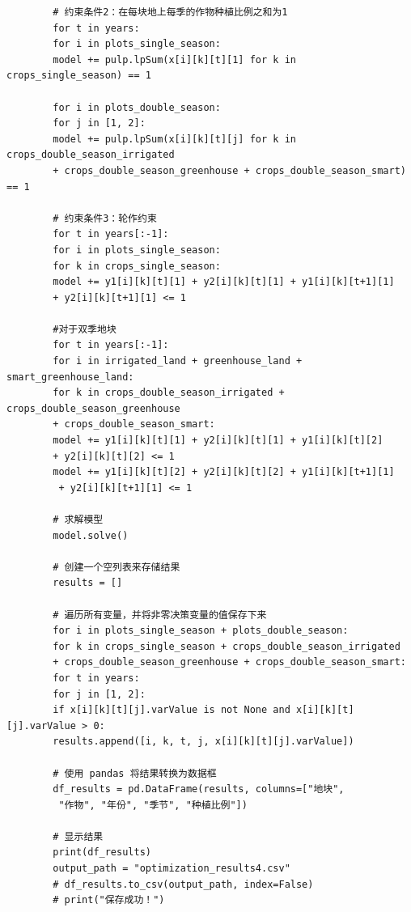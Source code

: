 \documentclass[12pt]{ctexart}
\begin{document}
\begin{verbatim}
		# 约束条件2：在每块地上每季的作物种植比例之和为1
		for t in years:
		for i in plots_single_season:
		model += pulp.lpSum(x[i][k][t][1] for k in crops_single_season) == 1
		
		for i in plots_double_season:
		for j in [1, 2]:
		model += pulp.lpSum(x[i][k][t][j] for k in crops_double_season_irrigated
		+ crops_double_season_greenhouse + crops_double_season_smart) == 1
		
		# 约束条件3：轮作约束
		for t in years[:-1]: 
		for i in plots_single_season:
		for k in crops_single_season:
		model += y1[i][k][t][1] + y2[i][k][t][1] + y1[i][k][t+1][1] 
		+ y2[i][k][t+1][1] <= 1
		
		#对于双季地块
		for t in years[:-1]: 
		for i in irrigated_land + greenhouse_land + smart_greenhouse_land:
		for k in crops_double_season_irrigated + crops_double_season_greenhouse
		+ crops_double_season_smart:
		model += y1[i][k][t][1] + y2[i][k][t][1] + y1[i][k][t][2] 
		+ y2[i][k][t][2] <= 1
		model += y1[i][k][t][2] + y2[i][k][t][2] + y1[i][k][t+1][1]
		 + y2[i][k][t+1][1] <= 1
		
		# 求解模型
		model.solve()
		
		# 创建一个空列表来存储结果
		results = []
		
		# 遍历所有变量，并将非零决策变量的值保存下来
		for i in plots_single_season + plots_double_season:
		for k in crops_single_season + crops_double_season_irrigated 
		+ crops_double_season_greenhouse + crops_double_season_smart:
		for t in years:
		for j in [1, 2]:
		if x[i][k][t][j].varValue is not None and x[i][k][t][j].varValue > 0:
		results.append([i, k, t, j, x[i][k][t][j].varValue])
		
		# 使用 pandas 将结果转换为数据框
		df_results = pd.DataFrame(results, columns=["地块",
		 "作物", "年份", "季节", "种植比例"])
		
		# 显示结果
		print(df_results)
		output_path = "optimization_results4.csv"
		# df_results.to_csv(output_path, index=False)
		# print("保存成功！")
	\end{verbatim}
	
	
	\noindent 
\end{document}

